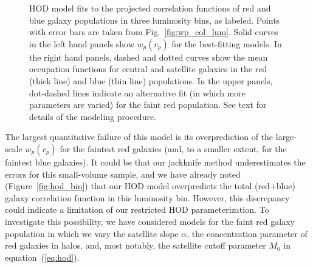 \documentclass[]{emulateapj}
\newcommand{\wrp}{{w_p(r_p)}}
\begin{document}
\begin{figure*}[tbp]
\caption[]{\label{fig:hod_col_lum}
HOD model fits to the projected correlation functions 
of red and blue galaxy populations in three luminosity bins,
as labeled.  Points with error bars are taken from 
Fig.~\ref{fig:wp_col_lum}.  Solid curves in the left hand
panels show $\wrp$ for the best-fitting models.  In the right
hand panels, dashed and dotted curves show the mean occupation
functions for central and satellite galaxies in the red (thick line)
and blue (thin line) populations.  In the upper panels, dot-dashed
lines indicate an alternative fit (in which more parameters are varied)
for the faint red population.  See text for details of 
the modeling procedure.
}
\end{figure*}


The largest quantitative failure of this model
is its overprediction of the large-scale $\wrp$ for the faintest
red galaxies (and, to a smaller extent, for the faintest blue galaxies).
It could be that our jackknife method underestimates the errors for
this small-volume sample, and we have already noted 
(Figure~\ref{fig:hod_bin}) that our HOD model overpredicts the total
(red+blue) galaxy correlation function in this luminosity bin.
However, this discrepancy could indicate a limitation of our
restricted HOD parameterization.  
To investigate this possibility, we have considered models for the
faint red galaxy population in which
we vary the satellite slope $\alpha$, the concentration parameter
of red galaxies in halos, and, most notably, the satellite cutoff parameter
$M_0$ in equation~(\ref{eq:hod}).  
\end{document}
